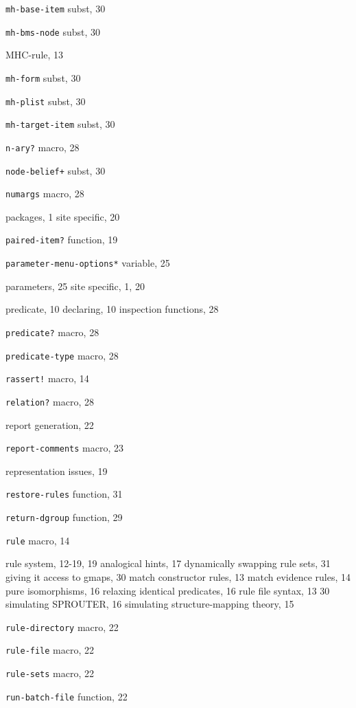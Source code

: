 \begin{theindex}
\item {\tt mh-base-item} subst, 30
\item {\tt mh-bms-node} subst, 30
\item MHC-rule, 13
\item {\tt mh-form} subst, 30
\item {\tt mh-plist} subst, 30
\item {\tt mh-target-item} subst, 30
\indexspace
\item {\tt n-ary?} macro, 28
\item {\tt node-belief+} subst, 30
\item {\tt numargs} macro, 28
\indexspace
\item packages, 1
	\subitem site specific, 20
\item {\tt paired-item?} function, 19
\item {\tt *parameter-menu-options*} variable, 25
\item parameters, 25
	\subitem  site specific, 1, 20
\item predicate, 10
	\subitem  declaring, 10
	\subitem  inspection functions, 28
\item {\tt predicate?} macro, 28
\item {\tt predicate-type} macro, 28
\indexspace
\item {\tt rassert!} macro, 14
\item {\tt relation?} macro, 28
\item report generation, 22
\item {\tt report-comments} macro, 23
\item representation issues, 19
\item {\tt restore-rules} function, 31
\item {\tt return-dgroup} function, 29
\item {\tt rule} macro, 14
\item rule system, 12-19, 19
	\subitem  analogical hints, 17
	\subitem  dynamically swapping rule sets, 31
	\subitem  giving it access to gmaps, 30
	\subitem  match constructor rules, 13
	\subitem  match evidence rules, 14
	\subitem  pure isomorphisms, 16
	\subitem  relaxing identical predicates, 16
	\subitem  rule file syntax, 13
	 30
	\subitem  simulating SPROUTER, 16
	\subitem  simulating structure-mapping theory, 15
\item {\tt rule-directory} macro, 22
\item {\tt rule-file} macro, 22
\item {\tt rule-sets} macro, 22
\item {\tt run-batch-file} function, 22

\end{theindex}

